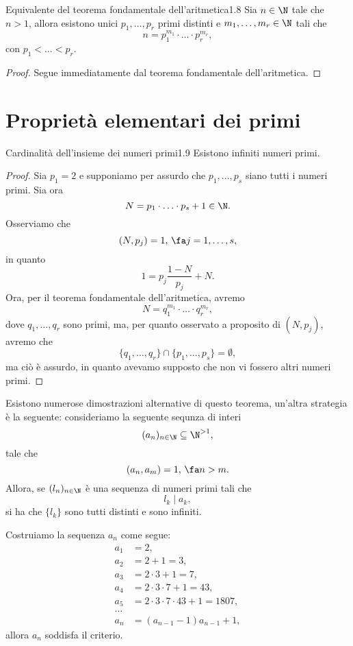 \begin{teor}{Equivalente del teorema fondamentale dell'aritmetica}{1.8}
	Sia \(n\in\N\) tale che \(n>1\), allora esistono unici \(p_1,\dots,p_r\) primi distinti e \(m_1,\dots,m_r\in\N\) tali che
	\[
		n=p_1^{m_1}\cdot\ldots\cdot p_r^{m_r},
	\]
	con \(p_1<\dots<p_r\).
\end{teor}

\begin{proof}
	Segue immediatamente dal teorema fondamentale dell'aritmetica.
\end{proof}
\section{Proprietà elementari dei primi}

\begin{teor}{Cardinalità dell'insieme dei numeri primi}{1.9}
	Esistono infiniti numeri primi.
\end{teor}

\begin{proof}
	Sia \(p_1=2\) e supponiamo per assurdo che \(p_1,\dots,p_s\) siano tutti i numeri primi.
	Sia ora
	\[
		N=p_1\cdot\ldots\cdot p_s+1\in\N.
	\]
	Osserviamo che
	\[
		(N,p_j)=1,\,\fa j=1,\dots,s,
	\]
	in quanto
	\[
		1=p_j\frac{1-N}{p_j}+N.
	\]
	Ora, per il teorema fondamentale dell'aritmetica, avremo
	\[
		N=q_1^{m_1}\cdot\ldots\cdot q_r^{m_r},
	\]
	dove \(q_1,\dots,q_r\) sono primi, ma, per quanto osservato a proposito di \((N,p_j)\), avremo che
	\[
		\{q_1,\dots,q_r\}\cap\{p_1,\dots,p_s\}=\emptyset,
	\]
	ma ciò è assurdo, in quanto avevamo supposto che non vi fossero altri numeri primi.
\end{proof}

\begin{oss}
	Esistono numerose dimostrazioni alternative di questo teorema, un'altra strategia è la seguente: consideriamo la seguente sequnza di interi
	\[
		(a_n)_{n\in\N}\subseteq \N^{>1},
	\]
	tale che
	\[
		(a_n,a_m)=1,\,\fa n>m.
	\]
	Allora, se \((l_n)_{n\in\N}\) è una sequenza di numeri primi tali che
	\[
		l_k\mid a_k,
	\]
	si ha che \(\{l_k\}\) sono tutti distinti e sono infiniti.
\end{oss}

\begin{ese}
	Costruiamo la sequenza \(a_n\) come segue:
	\begin{align*}
		a_1 & =2,                           \\
		a_2 & =2+1=3,                       \\
		a_3 & =2\cdot 3+1=7,                \\
		a_4 & =2\cdot3\cdot7+1=43,          \\
		a_5 & =2\cdot3\cdot7\cdot43+1=1807, \\
		\dots                               \\
		a_n & =(a_{n-1}-1)a_{n-1}+1,
	\end{align*}
	allora \(a_n\) soddisfa il criterio.
\end{ese}

